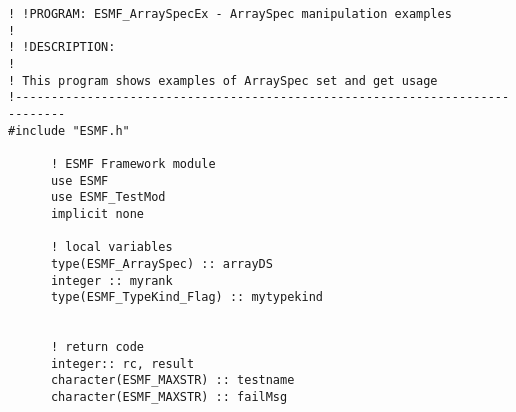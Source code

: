  
\setlength{\oldparskip}{\parskip}
\setlength{\parskip}{1.5ex}
\setlength{\oldparindent}{\parindent}
\setlength{\parindent}{0pt}
\setlength{\oldbaselineskip}{\baselineskip}
\setlength{\baselineskip}{11pt}
 
\def\bv{\begin{verbatim}}
\def\ev{\end{verbatim}}
\def\be{\begin{equation}}
\def\ee{\end{equation}}
\def\bea{\begin{eqnarray}}
\def\eea{\end{eqnarray}}
\def\bi{\begin{itemize}}
\def\ei{\end{itemize}}
\def\bn{\begin{enumerate}}
\def\en{\end{enumerate}}
\def\bd{\begin{description}}
\def\ed{\end{description}}
\def\({\left (}
\def\){\right )}
\def\[{\left [}
\def\]{\right ]}
\def\<{\left  \langle}
\def\>{\right \rangle}
\def\cI{{\cal I}}
\def\diag{\mathop{\rm diag}}
\def\tr{\mathop{\rm tr}}


 

 \begin{verbatim}
! !PROGRAM: ESMF_ArraySpecEx - ArraySpec manipulation examples
!
! !DESCRIPTION:
!
! This program shows examples of ArraySpec set and get usage
!-----------------------------------------------------------------------------
#include "ESMF.h"

      ! ESMF Framework module
      use ESMF
      use ESMF_TestMod
      implicit none

      ! local variables
      type(ESMF_ArraySpec) :: arrayDS
      integer :: myrank
      type(ESMF_TypeKind_Flag) :: mytypekind


      ! return code
      integer:: rc, result
      character(ESMF_MAXSTR) :: testname
      character(ESMF_MAXSTR) :: failMsg
 
\end{verbatim}
 
